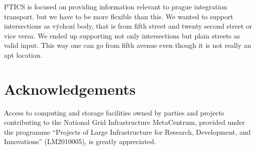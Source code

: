 PTICS is focused on providing information relevant to prague integration transport. but we have to be more flexible than this. We wanted to support intersections as výchozí body, that is from fifth street and twenty second street or vice versa. We ended up supporting not only intersections but plain streets as valid input. This way one can go from fifth avenue even though it is not really an apt location.





\section{Acknowledgements}

Access to computing and storage facilities owned by parties and projects contributing to the National Grid Infrastructure MetaCentrum, provided under the programme ``Projects of Large Infrastructure for Research, Development, and Innovations'' (LM2010005), is greatly appreciated.